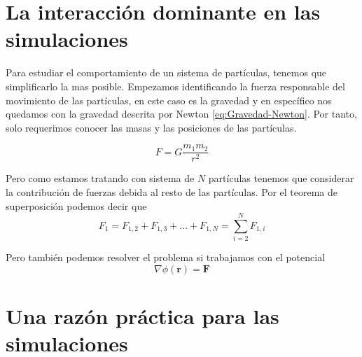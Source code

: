 \section{La interacción dominante en las simulaciones}

Para estudiar el comportamiento de un sistema de partículas, tenemos que simplificarlo la mas posible. Empezamos identificando la fuerza responsable del movimiento de las partículas, en este caso es la gravedad y en específico nos quedamos con la gravedad descrita por Newton \eqref{eq:Gravedad-Newton}. Por tanto, solo requerimos conocer las masas y las posiciones de las partículas.

\begin{equation}
    F = G \frac{m_1 m_2}{r^2}
    \label{eq:Gravedad-Newton}
\end{equation}

Pero como estamos tratando con sistema de $N$ partículas tenemos que considerar la contribución de fuerzas debida al resto de las partículas. Por el teorema de superposición podemos decir que
\begin{equation}
    F_{1} = F_{1,2} +F_{1,3} + \dots + F_{1,N} = \sum_{i=2}^{N} F_{1,i} 
    \label{eq:superposicion}
\end{equation}

Pero también podemos resolver el problema si trabajamos con el potencial
\begin{equation}
    \nabla \phi(\mathbf{r}) = \mathbf{F}
    \label{eq:potencial-gravitacional}
\end{equation}

\section{Una razón práctica para las simulaciones}

